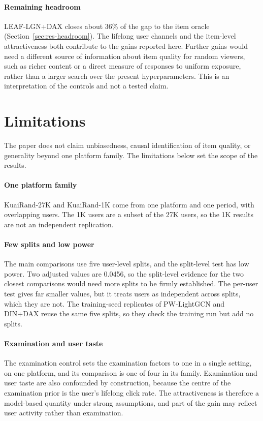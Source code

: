 \documentclass[preprint,12pt,authoryear]{elsarticle}
\begin{document}
\paragraph{Remaining headroom} LEAF-LGN+DAX closes about 36\% of the gap to the item oracle (Section~\ref{sec:res-headroom}). The lifelong user
channels and the item-level attractiveness both contribute to the gains reported here. Further gains would need a different source of
information about item quality for random viewers, such as richer content or a direct measure of responses to uniform exposure, rather than a
larger search over the present hyperparameters. This is an interpretation of the controls and not a tested claim.

\section{Limitations}
\label{sec:limits}

The paper does not claim unbiasedness, causal identification of item quality, or generality beyond one platform family. The limitations
below set the scope of the results.

\paragraph{One platform family} KuaiRand-27K and KuaiRand-1K come from one platform and one period, with overlapping users. The 1K users are a
subset of the 27K users, so the 1K results are not an independent replication.

\paragraph{Few splits and low power} The main comparisons use five user-level splits, and the split-level test has low power. Two adjusted values are 0.0456, so the split-level evidence for the two closest comparisons would need more splits to be firmly established. The per-user test gives far smaller values, but it treats users
as independent across splits, which they are not. The training-seed replicates of PW-LightGCN and DIN+DAX reuse the same five splits, so they check the training run but add no splits.

\paragraph{Examination and user taste} The examination control sets the examination factors to one in a single setting, on one platform,
and its comparison is one of four in its family. Examination and user taste are also confounded by construction, because the centre of
the examination prior is the user's lifelong click rate. The attractiveness is therefore a model-based quantity under strong assumptions,
and part of the gain may reflect user activity rather than examination.
\end{document}
